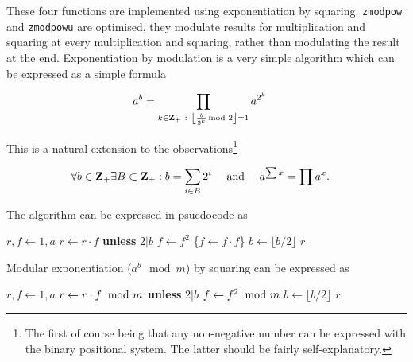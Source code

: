 These four functions are implemented using
exponentiation by squaring. {\tt zmodpow} and
{\tt zmodpowu} are optimised, they modulate
results for multiplication and squaring at
every multiplication and squaring, rather than
modulating the result at the end. Exponentiation
by modulation is a very simple algorithm which
can be expressed as a simple formula

\vspace{-1em}
\[ \hspace*{-0.4cm}
    a^b =
    \prod_{k \in \textbf{Z}_{+} ~:~ \left \lfloor \frac{b}{2^k} \hspace*{-1ex} \mod 2 \right \rfloor = 1}
    a^{2^k}
\]

\noindent
This is a natural extension to the
observations\footnote{The first of course being
that any non-negative number can be expressed
with the binary positional system. The latter
should be fairly self-explanatory.}

\vspace{-1em}
\[ \hspace*{-0.4cm}
    \forall b \in \textbf{Z}_{+} \exists B \subset \textbf{Z}_{+} : b = \sum_{i \in B} 2^i
    ~~~~ \textrm{and} ~~~~
    a^{\sum x} = \prod a^x.
\]

\noindent
The algorithm can be expressed in psuedocode as

\vspace{1em}
\hspace{-2.8ex}
\begin{minipage}{\linewidth}
\begin{algorithmic}
    \STATE $r, f \gets 1, a$
      \STATE $r \gets r \cdot f$ {\bf unless} $2 \vert b$
      \STATE $f \gets f^2$ \textcolor{c}{\{$f \gets f \cdot f$\}}
      \STATE $b \gets \lfloor b / 2 \rfloor$
    \ENDWHILE
    \RETURN $r$ 
\end{algorithmic}
\end{minipage}
\vspace{1em}

\noindent
Modular exponentiation ($a^b \mod m$) by squaring can be
expressed as

\vspace{1em}
\hspace{-2.8ex}
\begin{minipage}{\linewidth}
\begin{algorithmic}
    \STATE $r, f \gets 1, a$
      \STATE $r \gets r \cdot f \hspace*{-1ex}~ \mod m$ \textbf{unless} $2 \vert b$
      \STATE $f \gets f^2 \hspace*{-1ex}~ \mod m$
      \STATE $b \gets \lfloor b / 2 \rfloor$
    \ENDWHILE
    \RETURN $r$ 
\end{algorithmic}
\end{minipage}
\vspace{1em}

